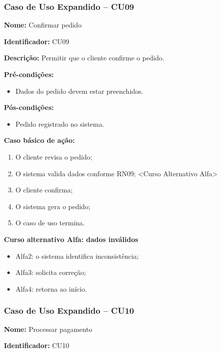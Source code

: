 \documentclass[12pt]{article}
\begin{document}

\subsubsection{Caso de Uso Expandido -- CU09}

\textbf{Nome:} Confirmar pedido

\textbf{Identificador:} CU09

\textbf{Descrição:} Permitir que o cliente confirme o pedido.

\textbf{Pré-condições:}
\begin{itemize}
\item Dados do pedido devem estar preenchidos.
\end{itemize}

\textbf{Pós-condições:}
\begin{itemize}
\item Pedido registrado no sistema.
\end{itemize}

\textbf{Caso básico de ação:}
\begin{enumerate}
\item O cliente revisa o pedido;
\item O sistema valida dados conforme RN09; <Curso Alternativo Alfa>
\item O cliente confirma;
\item O sistema gera o pedido;
\item O caso de uso termina.
\end{enumerate}

\textbf{Curso alternativo Alfa: dados inválidos}

\begin{itemize}
\item Alfa2: o sistema identifica inconsistência;
\item Alfa3: solicita correção;
\item Alfa4: retorna ao início.
\end{itemize}


\subsubsection{Caso de Uso Expandido -- CU10}

\textbf{Nome:} Processar pagamento

\textbf{Identificador:} CU10
\end{document}
